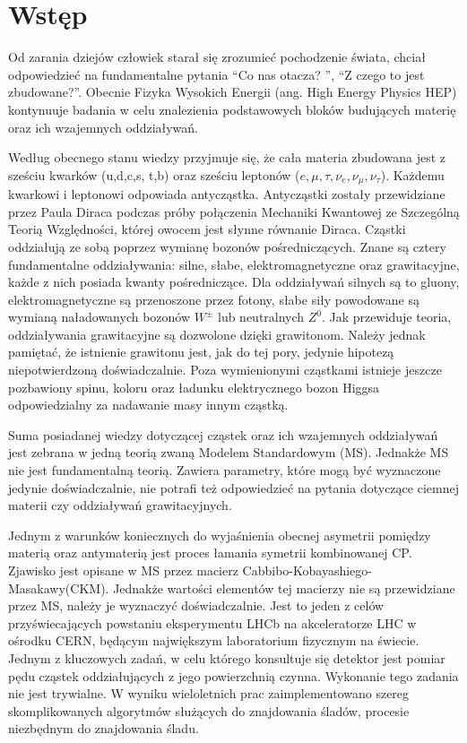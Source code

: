 \chapter*{Wstęp}

Od zarania dziejów człowiek starał się zrozumieć pochodzenie świata, chciał odpowiedzieć na fundamentalne pytania ``Co nas otacza? '', ``Z czego to jest zbudowane?''. Obecnie Fizyka Wysokich Energii (ang. High Energy Physics HEP) kontynuuje badania w celu znalezienia podstawowych bloków budujących materię oraz ich wzajemnych oddziaływań.

Według obecnego stanu wiedzy przyjmuje się, że cała materia zbudowana jest z sześciu kwarków (u,d,c,s, t,b) oraz sześciu leptonów ($e, \mu, \tau, \nu_e,\nu_{\mu},\nu_{\tau}$). Każdemu kwarkowi i leptonowi odpowiada antycząstka. Antycząstki zostały przewidziane przez Paula Diraca podczas próby połączenia Mechaniki Kwantowej ze Szczególną Teorią Względności, której owocem jest słynne równanie Diraca. Cząstki oddziałują ze sobą poprzez wymianę bozonów pośredniczących. Znane są cztery fundamentalne oddziaływania: silne, słabe, elektromagnetyczne oraz grawitacyjne, każde z nich posiada kwanty pośredniczące. Dla oddziaływań silnych są to gluony, elektromagnetyczne są przenoszone przez fotony, słabe siły powodowane są wymianą naładowanych bozonów $W^{\pm}$ lub neutralnych $Z^{0}$. Jak przewiduje teoria, oddziaływania grawitacyjne są dozwolone dzięki grawitonom. Należy jednak pamiętać, że istnienie grawitonu jest, jak do tej pory, jedynie hipotezą niepotwierdzoną doświadczalnie. Poza wymienionymi cząstkami istnieje jeszcze pozbawiony spinu, koloru oraz ładunku elektrycznego bozon Higgsa odpowiedzialny za nadawanie masy innym cząstką.

Suma posiadanej wiedzy dotyczącej cząstek oraz ich wzajemnych oddziaływań jest zebrana w jedną teorią zwaną Modelem Standardowym (MS). Jednakże MS nie jest fundamentalną teorią. Zawiera parametry, które mogą być wyznaczone jedynie doświadczalnie, nie potrafi też odpowiedzieć na pytania dotyczące ciemnej materii czy oddziaływań grawitacyjnych.

Jednym z warunków koniecznych do wyjaśnienia obecnej asymetrii pomiędzy materią oraz antymaterią jest proces łamania symetrii kombinowanej CP. Zjawisko jest opisane w MS przez macierz Cabbibo-Kobayashiego-Masakawy(CKM). Jednakże wartości elementów tej macierzy nie są przewidziane przez MS, należy je wyznaczyć doświadczalnie. 
Jest to jeden z celów przyświecających powstaniu eksperymentu LHCb na akceleratorze LHC w ośrodku CERN, będącym największym laboratorium fizycznym na świecie. Jednym z kluczowych zadań, w celu którego konsultuje się detektor jest pomiar pędu cząstek oddziałujących z jego powierzchnią czynna. Wykonanie tego zadania nie jest trywialne. W wyniku wieloletnich prac zaimplementowano szereg skomplikowanych algorytmów służących do znajdowania śladów, procesie niezbędnym do znajdowania śladu. 

